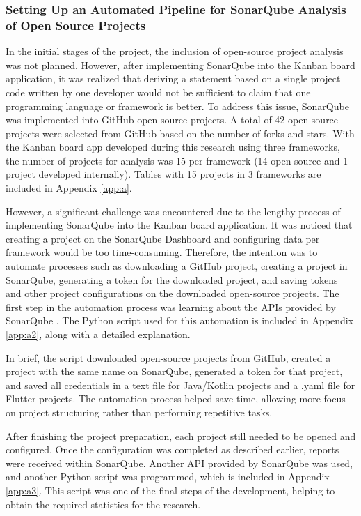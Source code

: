 \subsubsection{Setting Up an Automated Pipeline for SonarQube Analysis of Open Source Projects}

In the initial stages of the project, the inclusion of open-source project analysis was not planned. However, after implementing SonarQube into the Kanban board application, it was realized that deriving a statement based on a single project code written by one developer would not be sufficient to claim that one programming language or framework is better. To address this issue, SonarQube was implemented into GitHub open-source projects. A total of 42 open-source projects were selected from GitHub based on the number of forks and stars. With the Kanban board app developed during this research using three frameworks, the number of projects for analysis was 15 per framework (14 open-source and 1 project developed internally). Tables with 15 projects in 3 frameworks are included in Appendix \ref{app:a}.
\par
However, a significant challenge was encountered due to the lengthy process of implementing SonarQube into the Kanban board application. It was noticed that creating a project on the SonarQube Dashboard and configuring data per framework would be too time-consuming. Therefore, the intention was to automate processes such as downloading a GitHub project, creating a project in SonarQube, generating a token for the downloaded project, and saving tokens and other project configurations on the downloaded open-source projects. The first step in the automation process was learning about the APIs provided by SonarQube \cite{sonarQube}. The Python script used for this automation is included in Appendix \ref{app:a2}, along with a detailed explanation.
\par
In brief, the script downloaded open-source projects from GitHub, created a project with the same name on SonarQube, generated a token for that project, and saved all credentials in a text file for Java/Kotlin projects and a .yaml file for Flutter projects. The automation process helped save time, allowing more focus on project structuring rather than performing repetitive tasks.
\par
After finishing the project preparation, each project still needed to be opened and configured. Once the configuration was completed as described earlier, reports were received within SonarQube. Another API provided by SonarQube was used, and another Python script was programmed, which is included in Appendix \ref{app:a3}. This script was one of the final steps of the development, helping to obtain the required statistics for the research.